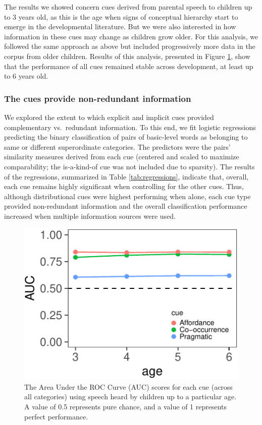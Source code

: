 \documentclass[english,,man,floatsintext]{apa6}
\begin{document}
The results we showed concern cues derived from parental speech to children up to 3
years old, as this is the age when signs of conceptual hierarchy start
to emerge in the developmental literature. But we were also interested
in how information in these cues may change as children grow older.
For this analysis, we followed the same approach as above but included progressively more data in the corpus from older children. Results of this analysis, presented in Figure \ref{fig:dev}, show that the performance of all cues
remained stable across development, at least up to 6 years old.

\hypertarget{the-cues-provide-non-redundant-information}{%
\subsubsection{The cues provide non-redundant information}\label{the-cues-provide-non-redundant-information}}

We explored the extent to which explicit and implicit cues provided
complementary vs.~redundant information. To this end, we fit logistic
regressions predicting the binary classification of pairs of basic-level
words as belonging to same or different superordinate categories. The
predictors were the pairs' similarity measures derived from each cue (centered and scaled to maximize comparability; the is-a-kind-of cue was not included due to sparsity). The results of the regressions,
summarized in Table \ref{tab:regressions}, indicate that, overall, each cue remains highly significant when controlling for the other cues. Thus, although distributional cues were highest performing when alone, each cue type provided non-redundant information and the overall classification performance increased when multiple information sources were used.

\begin{figure}[h]

{\centering \includegraphics{cogsci_journal_files/figure-latex/dev-1} 

}

\caption{\label{fig:dev} The Area Under the ROC Curve (AUC) scores for each cue (across all categories) using speech heard by children up to a particular age. A value of 0.5 represents pure chance, and a value of 1 represents perfect performance.}\label{fig:dev}
\end{figure}
\end{document}
